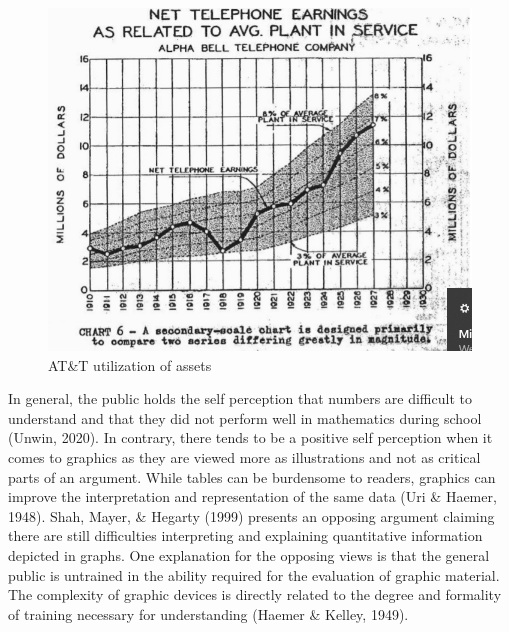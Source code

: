 \documentclass[print]{nuthesis}
\begin{document}
\begin{figure}[tbp]

{\centering \includegraphics[width=0.75\linewidth,]{images/ATandT-revenue} 

}

\caption{AT\&T utilization of assets}\label{fig:ATandT-revenue}
\end{figure}

In general, the public holds the self perception that numbers are difficult to understand and that they did not perform well in mathematics during school (Unwin, 2020).
In contrary, there tends to be a positive self perception when it comes to graphics as they are viewed more as illustrations and not as critical parts of an argument.
While tables can be burdensome to readers, graphics can improve the interpretation and representation of the same data (Uri \& Haemer, 1948).
Shah, Mayer, \& Hegarty (1999) presents an opposing argument claiming there are still difficulties interpreting and explaining quantitative information depicted in graphs. 
One explanation for the opposing views is that the general public is untrained in the ability required for the evaluation of graphic material.
The complexity of graphic devices is directly related to the degree and formality of training necessary for understanding (Haemer \& Kelley, 1949). 
\end{document}
